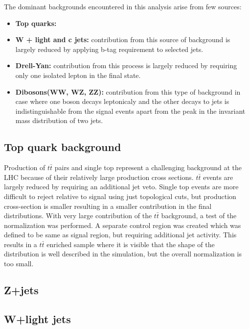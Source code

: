 The dominant backgrounds encountered in this analysis arise from few sources:
\begin{itemize}
        \item {\textbf{Top quarks:}} 
        \item {\textbf{W + light and c jets:}} contribution from this source of background is largely reduced by applying b-tag requirement to selected jets.
        \item {\textbf{Drell-Yan:}} contribution from this process is largely reduced by requiring only one isolated lepton in the final state.
        \item {\textbf{Dibosons(WW, WZ, ZZ):}} contribution from this type of background in case where one boson decays leptonicaly
and the other decays to jets  is indistinguishable from the signal events apart from the peak in the invariant mass distribution of two jets.
\end{itemize}



\subsection{Top quark background}

Production of $t\bar{t}$ pairs and single top represent a challenging background at the LHC because of their relatively large production cross sections. $t\bar{t}$ events are largely reduced by requiring an additional jet veto. Single top events are more difficult to reject relative to signal using just topological cuts, but production cross-section is smaller resulting in a smaller contribution in the final distributions.
With very large contribution of the $t\bar{t}$ background, a test of the normalization was performed. A separate control region was created which was defined to be same as signal region, but requiring additional jet activity. This results in a $t\bar{t}$ enriched sample where it is visible that the shape of the distribution is well described in the simulation, but the overall normalization is too small. 

\subsection{Z+jets}

\subsection{W+light jets}

